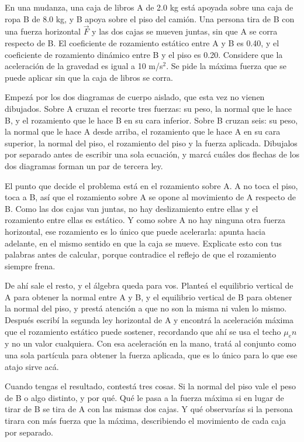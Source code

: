 \documentclass[11pt,openany]{book}
\begin{document}
\begin{ejemplo}[parcial]
En una mudanza, una caja de libros A de 2.0 kg está apoyada sobre una caja de ropa B de 8.0 kg, y B apoya sobre el piso del camión. Una persona tira de B con una fuerza horizontal $\vec F$ y las dos cajas se mueven juntas, sin que A se corra respecto de B. El coeficiente de rozamiento estático entre A y B es 0.40, y el coeficiente de rozamiento dinámico entre B y el piso es 0.20. Considere que la aceleración de la gravedad es igual a 10 m/s$^2$. Se pide la máxima fuerza que se puede aplicar sin que la caja de libros se corra.

Empezá por los dos diagramas de cuerpo aislado, que esta vez no vienen dibujados. Sobre A cruzan el recorte tres fuerzas: su peso, la normal que le hace B, y el rozamiento que le hace B en su cara inferior. Sobre B cruzan seis: su peso, la normal que le hace A desde arriba, el rozamiento que le hace A en su cara superior, la normal del piso, el rozamiento del piso y la fuerza aplicada. Dibujalos por separado antes de escribir una sola ecuación, y marcá cuáles dos flechas de los dos diagramas forman un par de tercera ley.

El punto que decide el problema está en el rozamiento sobre A. A no toca el piso, toca a B, así que el rozamiento sobre A se opone al movimiento de A respecto de B. Como las dos cajas van juntas, no hay deslizamiento entre ellas y el rozamiento entre ellas es estático. Y como sobre A no hay ninguna otra fuerza horizontal, ese rozamiento es lo único que puede acelerarla: apunta hacia adelante, en el mismo sentido en que la caja se mueve. Explicate esto con tus palabras antes de calcular, porque contradice el reflejo de que el rozamiento siempre frena.

De ahí sale el resto, y el álgebra queda para vos. Planteá el equilibrio vertical de A para obtener la normal entre A y B, y el equilibrio vertical de B para obtener la normal del piso, y prestá atención a que no son la misma ni valen lo mismo. Después escribí la segunda ley horizontal de A y encontrá la aceleración máxima que el rozamiento estático puede sostener, recordando que ahí se usa el techo $\mu_e n$ y no un valor cualquiera. Con esa aceleración en la mano, tratá al conjunto como una sola partícula para obtener la fuerza aplicada, que es lo único para lo que ese atajo sirve acá.

Cuando tengas el resultado, contestá tres cosas. Si la normal del piso vale el peso de B o algo distinto, y por qué. Qué le pasa a la fuerza máxima si en lugar de tirar de B se tira de A con las mismas dos cajas. Y qué observarías si la persona tirara con más fuerza que la máxima, describiendo el movimiento de cada caja por separado.
\end{ejemplo}
\end{document}
